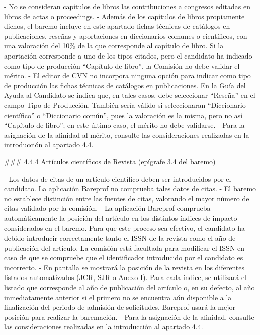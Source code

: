 \documentclass{article}
\begin{document}
\begin{itemize}
\begin{itemize}
\begin{scriptsize}
                  - No se consideran capítulos de libros las contribuciones a congresos editadas en libros de actas o proceedings.
                  - Además de los capítulos de libros propiamente dichos, el baremo incluye en este apartado fichas técnicas de catálogos en publicaciones, reseñas y aportaciones en diccionarios comunes o científicos, con una valoración del 10\% de la que corresponde al capítulo de libro. Si la aportación corresponde a uno de los tipos citados, pero el candidato ha indicado como tipo de producción “Capítulo de libro”, la Comisión no debe validar el mérito.
                  - El editor de CVN no incorpora ninguna opción para indicar como tipo de producción las fichas técnicas de catálogos en publicaciones. En la Guía del Ayuda al Candidato se indica que, en tales casos, debe seleccionar “Reseña” en el campo Tipo de Producción. También sería válido si seleccionaran “Diccionario científico” o “Diccionario común”, pues la valoración es la misma, pero no así “Capítulo de libro”; en este último caso, el mérito no debe validarse.
                  - Para la asignación de la afinidad al mérito, consulte las consideraciones realizadas en la introducción al apartado 4.4.

                  \#\#\# 4.4.4 Artículos científicos de Revista (epígrafe 3.4 del baremo)

                  - Los datos de citas de un artículo científico deben ser introducidos por el candidato. La aplicación Bareprof no comprueba tales datos de citas.
                  - El baremo no establece distinción entre las fuentes de citas, valorando el mayor número de citas validado por la comisión.
                  - La aplicación Bareprof comprueba automáticamente la posición del artículo en los distintos índices de impacto considerados en el baremo. Para que este proceso sea efectivo, el candidato ha debido introducir correctamente tanto el ISSN de la revista como el año de publicación del artículo. La comisión está facultada para modificar el ISSN en caso de que se compruebe que el identificador introducido por el candidato es incorrecto.
                  - En pantalla se mostrará la posición de la revista en los diferentes listados automatizados (JCR, SJR o Anexo I). Para cada índice, se utilizará el listado que corresponde al año de publicación del artículo o, en su defecto, al año inmediatamente anterior si el primero no se encuentra aún disponible a la finalización del periodo de admisión de solicitudes. Bareprof usará la mejor posición para realizar la baremación.
                  - Para la asignación de la afinidad, consulte las consideraciones realizadas en la introducción al apartado 4.4.


\end{scriptsize}
\end{itemize}
\end{itemize}
\end{document}
